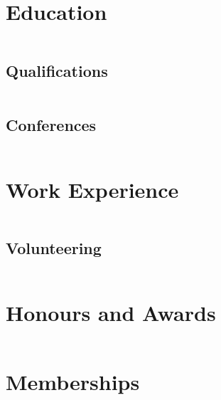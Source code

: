 \documentclass[
    a4paper,
    oneside,
    10pt
]{article}
\newenvironment{timeline}{%
	\begin{longtable}{ c | c }%
}{%
	\end{longtable}%
}
\begin{document}
    \section{Education}
    \begin{timeline}
    		
    \end{timeline}
    
    \subsection{Qualifications}
    \begin{timeline}
    		
    \end{timeline}
    
    \subsection{Conferences}
    \begin{timeline}
    		
    \end{timeline}
    
    \section{Work Experience}
	\begin{timeline}
    		
    \end{timeline}
    
    \subsection{Volunteering}
	\begin{timeline}
    		
    \end{timeline}
    
	\section{Honours and Awards}
    \begin{timeline}
    		
    \end{timeline}
    
    \section{Memberships}
    \begin{timeline}
    		
    \end{timeline}
    
\end{document}
